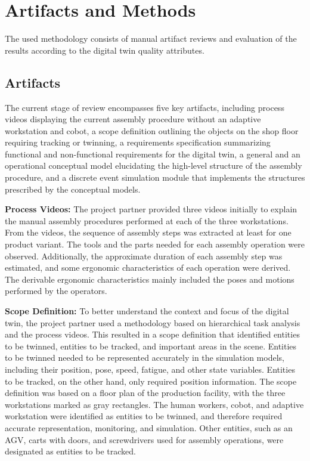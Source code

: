 \documentclass{llncs}
\begin{document}
    \section{Artifacts and Methods}
    The used methodology consists of manual artifact reviews and evaluation of the results according to the digital twin quality attributes.    
    \subsection{Artifacts}\label{section:Artifacts}
    The current stage of review encompasses five key artifacts, including process videos displaying the current assembly procedure without an adaptive workstation and cobot, a scope definition outlining the objects on the shop floor requiring tracking or twinning, a requirements specification summarizing functional and non-functional requirements for the digital twin, a general and an operational conceptual model elucidating the high-level structure of the assembly procedure, 
    and a discrete event simulation module that implements the structures prescribed by the conceptual models.

    \textbf{Process Videos:}
    The project partner provided three videos initially to explain the manual assembly procedures performed at each of the three workstations. From the videos,  
    the sequence of assembly steps was extracted at least for one product variant. The tools and the parts needed for each assembly operation were observed. Additionally, the approximate duration of each assembly step 
    was estimated, and some ergonomic characteristics of each operation were derived. 
    The derivable ergonomic characteristics mainly included the poses and motions performed by the operators.

    \textbf{Scope Definition:}
    To better understand the context and focus of the digital twin, 
    the project partner used a methodology based on hierarchical task analysis and the process videos. 
    This resulted in a scope definition that identified entities to be twinned, entities to be tracked, and important areas in the scene. 
    Entities to be twinned needed to be represented accurately in the simulation models, including their position, pose, speed, fatigue, and other state variables. 
    Entities to be tracked, on the other hand, only required position information. The scope definition was based on a floor plan of the production facility, with the three workstations marked as gray rectangles. 
    The human workers, cobot, and adaptive workstation were identified as entities to be twinned, and therefore required accurate representation, 
    monitoring, and simulation. Other entities, such as an AGV, carts with doors, and screwdrivers used for assembly operations, were designated as entities to be tracked.
\end{document}
